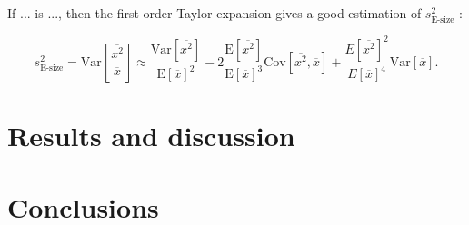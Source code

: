\documentclass[a4paper,11pt]{article}
\newcommand{\Var}{\text{Var}}
\newcommand{\Cov}{\text{Cov}}
\newcommand{\E}{\text{E}}
\begin{document}
If ... is ..., then the first order Taylor expansion gives a good estimation of $s_{\text{E-size}}^2$ \cite{Benaroya:2005aa}:

\[s_{\text{E-size}}^2 = \Var\left[\frac{\overline{x^2}}{\overline{x}}\right] \approx \frac{\Var\left[\overline{x^2}\right]}{\E\left[\overline{x}\right]^2} -2\frac{\E\left[\overline{x^2}\right]}{\E\left[\overline{x}\right]^3}\Cov\left[\overline{x^2},\overline{x}\right] + \frac{E\left[\overline{x^2}\right]^2}{E\left[\overline{x}\right]^4}\Var\left[\overline{x}\right].\] 


\section{Results and discussion} %
\label{sec:results_and_discussion}


\section{Conclusions} %
\label{sec:conclusions}




\end{document}

